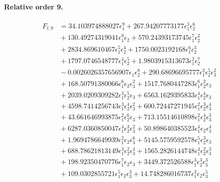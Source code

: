 \documentclass[10pt]{article}
\begin{document}
\paragraph{Relative order 9.}
\begin{align*}
F_{t,9} &= 34.103974888027 \epsilon_{1}^{9} + 267.94207773177 \epsilon_{1}^{3} \epsilon_{2}^{6} \\
&{}  + 130.49274319041 \epsilon_{1}^{8} \epsilon_{2} + 570.24393173745 \epsilon_{1}^{7} \epsilon_{2}^{2} \\
&{}  + 2834.869610467 \epsilon_{1}^{5} \epsilon_{2}^{4} + 1750.0023192168 \epsilon_{1}^{6} \epsilon_{2}^{3} \\
&{}  + 1797.0746548777 \epsilon_{1}^{4} \epsilon_{2}^{5} + 1.9803915313673 \epsilon_{1}^{2} \epsilon_{2}^{7} \\
&{}  - 0.0026026357656907 \epsilon_{1} \epsilon_{2}^{8} + 290.68696695777 \epsilon_{1}^{2} \epsilon_{2}^{5} \epsilon_{3}^{2} \\
&{}  + 168.50791380066 \epsilon_{1}^{6} \epsilon_{2} \epsilon_{3}^{2} + 1517.7680447283 \epsilon_{1}^{6} \epsilon_{2}^{2} \epsilon_{3} \\
&{}  + 2039.0209309282 \epsilon_{1}^{3} \epsilon_{2}^{5} \epsilon_{3} + 6563.1629395833 \epsilon_{1}^{4} \epsilon_{2}^{4} \epsilon_{3} \\
&{}  + 4598.7414256743 \epsilon_{1}^{3} \epsilon_{2}^{4} \epsilon_{3}^{2} + 600.72447271945 \epsilon_{1}^{2} \epsilon_{2}^{3} \epsilon_{3}^{4} \\
&{}  + 43.661646993875 \epsilon_{1}^{2} \epsilon_{2}^{6} \epsilon_{3} + 713.15514610898 \epsilon_{1}^{2} \epsilon_{2}^{4} \epsilon_{3}^{3} \\
&{}  + 6287.0360850047 \epsilon_{1}^{4} \epsilon_{2}^{3} \epsilon_{3}^{2} + 50.898640385523 \epsilon_{1}^{4} \epsilon_{2} \epsilon_{3}^{4} \\
&{}  + 1.9694786649939 \epsilon_{1}^{2} \epsilon_{2} \epsilon_{3}^{6} + 5145.5759592578 \epsilon_{1}^{5} \epsilon_{2}^{3} \epsilon_{3} \\
&{}  + 688.78621813149 \epsilon_{1}^{3} \epsilon_{2}^{2} \epsilon_{3}^{4} + 1565.2826144748 \epsilon_{1}^{4} \epsilon_{2}^{2} \epsilon_{3}^{3} \\
&{}  + 198.92350470776 \epsilon_{1}^{7} \epsilon_{2} \epsilon_{3} + 3449.372526588 \epsilon_{1}^{3} \epsilon_{2}^{3} \epsilon_{3}^{3} \\
&{}  + 109.0302855721 \epsilon_{1}^{5} \epsilon_{2} \epsilon_{3}^{3} + 14.748286016737 \epsilon_{1}^{3} \epsilon_{2} \epsilon_{3}^{5} \\

\end{align*}
\end{document}
